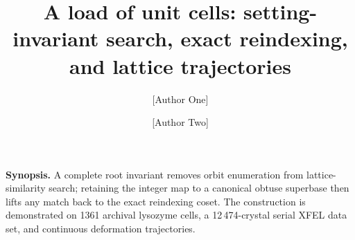 \documentclass[11pt]{article}
\title{\bfseries A load of unit cells: setting-invariant search,
exact reindexing, and lattice trajectories}
\author[1]{[Author One]}
\author[1]{[Author Two]}
\affil[1]{[Affiliation], [City], [Country]}
\date{}
\begin{document}
\maketitle

\begin{center}
\begin{minipage}{0.92\textwidth}
\small\noindent\textbf{Synopsis.}
A complete root invariant removes orbit enumeration from lattice-similarity
search; retaining the integer map to a canonical obtuse superbase then lifts
any match back to the exact reindexing coset. The construction is demonstrated
on 1361 archival lysozyme cells, a 12\,474-crystal serial XFEL data set, and
continuous deformation trajectories.
\end{minipage}
\end{center}
\end{document}
